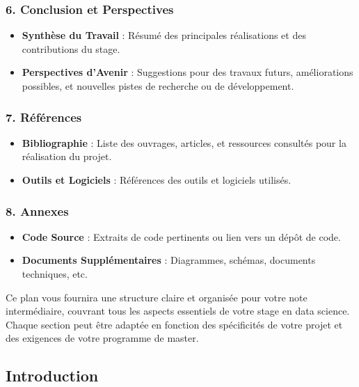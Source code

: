 \documentclass[
  letterpaper,
  DIV=11,
  numbers=noendperiod]{scrartcl}
\providecommand{\tightlist}{%
  \setlength{\itemsep}{0pt}\setlength{\parskip}{0pt}}\usepackage{longtable,booktabs,array}
\begin{document}
\subsubsection{6. Conclusion et
Perspectives}\label{conclusion-et-perspectives}

\begin{itemize}
\tightlist
\item
  \textbf{Synthèse du Travail} : Résumé des principales réalisations et
  des contributions du stage.
\item
  \textbf{Perspectives d'Avenir} : Suggestions pour des travaux futurs,
  améliorations possibles, et nouvelles pistes de recherche ou de
  développement.
\end{itemize}

\subsubsection{7. Références}\label{ruxe9fuxe9rences}

\begin{itemize}
\tightlist
\item
  \textbf{Bibliographie} : Liste des ouvrages, articles, et ressources
  consultés pour la réalisation du projet.
\item
  \textbf{Outils et Logiciels} : Références des outils et logiciels
  utilisés.
\end{itemize}

\subsubsection{8. Annexes}\label{annexes}

\begin{itemize}
\tightlist
\item
  \textbf{Code Source} : Extraits de code pertinents ou lien vers un
  dépôt de code.
\item
  \textbf{Documents Supplémentaires} : Diagrammes, schémas, documents
  techniques, etc.
\end{itemize}

Ce plan vous fournira une structure claire et organisée pour votre note
intermédiaire, couvrant tous les aspects essentiels de votre stage en
data science. Chaque section peut être adaptée en fonction des
spécificités de votre projet et des exigences de votre programme de
master.

\subsection{Introduction}\label{introduction-1}
\end{document}
